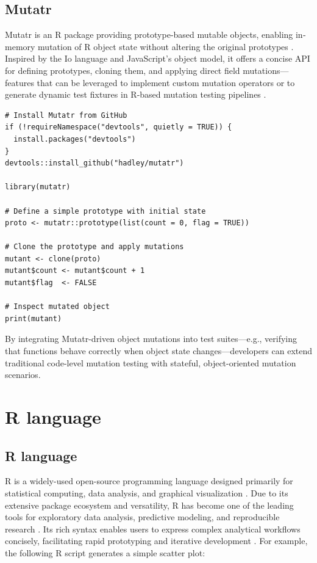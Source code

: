 \subsection{Mutatr}

Mutatr is an R package providing prototype‐based mutable objects, enabling in‐memory mutation of R object state without altering the original prototypes \cite{hadley-mutatr}. Inspired by the Io language and JavaScript’s object model, it offers a concise API for defining prototypes, cloning them, and applying direct field mutations—features that can be leveraged to implement custom mutation operators or to generate dynamic test fixtures in R-based mutation testing pipelines \cite{iolanguage}.

\begin{verbatim}
# Install Mutatr from GitHub
if (!requireNamespace("devtools", quietly = TRUE)) {
  install.packages("devtools")
}
devtools::install_github("hadley/mutatr")

library(mutatr)

# Define a simple prototype with initial state
proto <- mutatr::prototype(list(count = 0, flag = TRUE))

# Clone the prototype and apply mutations
mutant <- clone(proto)
mutant$count <- mutant$count + 1
mutant$flag  <- FALSE

# Inspect mutated object
print(mutant)
\end{verbatim}

By integrating Mutatr-driven object mutations into test suites—e.g., verifying that functions behave correctly when object state changes—developers can extend traditional code-level mutation testing with stateful, object-oriented mutation scenarios.

\section{R language}

\subsection{R language}

R is a widely-used open-source programming language designed primarily for statistical computing, data analysis, and graphical visualization \cite{rcore2024}. Due to its extensive package ecosystem and versatility, R has become one of the leading tools for exploratory data analysis, predictive modeling, and reproducible research \cite{wickham2014advanced}. Its rich syntax enables users to express complex analytical workflows concisely, facilitating rapid prototyping and iterative development \cite{wickham2019r4ds}. For example, the following R script generates a simple scatter plot:

